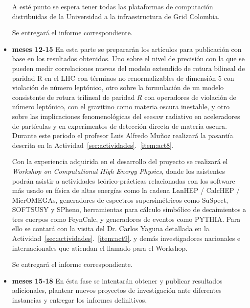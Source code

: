 \begin{itemize}
  A esté punto se espera tener todas las plataformas de computación
  distribuidas de la Universidad a la infraestructura de Grid
  Colombia. 

  Se entregará el informe correspondiente.

\item \textbf{meses 12-15} En esta parte se prepararán los artículos
  para publicación con base en los resultados obtenidos. Uno sobre el
  nivel de precisión con la que se pueden medir correlaciones nuevas
  del modelo extendido de rotura bilineal de paridad R en el LHC con
  términos no renormalizables de dimensión 5 con violación de número
  leptónico, otro sobre la formulación de un modelo consistente de
  rotura trilineal de paridad $R$ con operadores de violación de
  número leptónico, con el gravitino como materia oscura inestable, y
  otro sobre las implicaciones fenomenológicas del seesaw radiativo en
  aceleradores de partículas y en experimentos de detección directa de
  materia oscura. Durante este período el profesor Luis Alfredo Muñoz
  realizará la pasantía descrita en la
  Actividad~\ref{sec:actividades}.~\ref{item:act8}. 

  Con la experiencia adquirida en el desarrollo del proyecto se
  realizará el \emph{Workshop on Computational High Energy Physics},
  donde los asistentes podrán asistir a actividades teórico-prácticas
  relacionadas con los software más usado en física de altas energías
  como la cadena LanHEP / CalcHEP / MicrOMEGAs, generadores de espectros
  supersimétricos como SuSpect, SOFTSUSY y SPheno, herramientas para
  cálculo simbólico de decaimientos a tres cuerpos como FeynCalc, y
  generadores de eventos como PYTHIA. Para ello se contará con la
  visita del Dr. Carlos Yaguna detallada en la
  Actividad~\ref{sec:actividades}.~\ref{item:act9}. y demás
  investigadores nacionales e internacionales que atiendan el llamado
  para el Workshop.

  Se entregará el informe correspondiente.
\item \textbf{meses 15-18}
  En ésta fase se intentarán obtener y publicar resultados
  adicionales, plantear nuevos proyectos de investigación ante
  diferentes instancias y entregar los informes definitivos.
\end{itemize}

